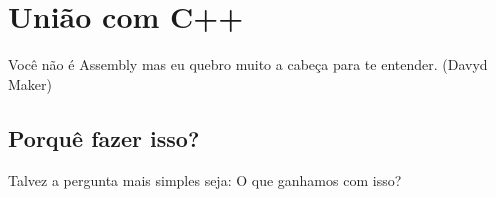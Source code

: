 \chapter{União com C++}

\begin{remark}
	Você não é Assembly mas eu quebro muito a cabeça para te entender. (Davyd Maker) 
\end{remark}

\section{Porquê fazer isso?}
Talvez a pergunta mais simples seja: O que ganhamos com isso?


\clearpage